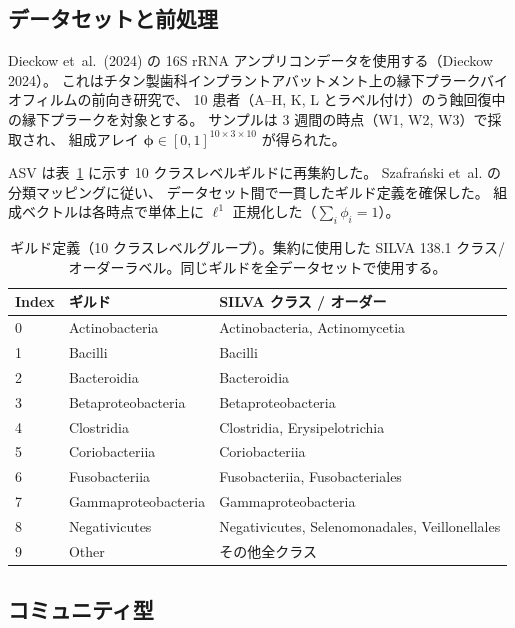 \documentclass[11pt,a4paper]{article}
\newcommand{\bphi}{\boldsymbol{\phi}}
\begin{document}
\subsection{データセットと前処理}
\label{ssec:data}

Dieckow et~al.~(2024) の 16S rRNA アンプリコンデータを使用する（Dieckow 2024）。
これはチタン製歯科インプラントアバットメント上の縁下プラークバイオフィルムの前向き研究で、
10 患者（A--H, K, L とラベル付け）のう蝕回復中の縁下プラークを対象とする。
サンプルは 3 週間の時点（W1, W2, W3）で採取され、
組成アレイ $\bphi \in [0,1]^{10 \times 3 \times 10}$ が得られた。

ASV は表~\ref{tab:guilds} に示す 10 クラスレベルギルドに再集約した。
Szafra\'{n}ski et~al. の分類マッピングに従い、
データセット間で一貫したギルド定義を確保した。
組成ベクトルは各時点で単体上に $\ell^1$ 正規化した（$\sum_i \phi_i = 1$）。

\begin{table}[htb]
\centering
\caption{ギルド定義（10 クラスレベルグループ）。集約に使用した SILVA 138.1 クラス/オーダーラベル。同じギルドを全データセットで使用する。}
\label{tab:guilds}
\small
\begin{tabular}{lll}
\toprule
\textbf{Index} & \textbf{ギルド} & \textbf{SILVA クラス / オーダー} \\
\midrule
0 & Actinobacteria       & Actinobacteria, Actinomycetia \\
1 & Bacilli              & Bacilli \\
2 & Bacteroidia          & Bacteroidia \\
3 & Betaproteobacteria   & Betaproteobacteria \\
4 & Clostridia           & Clostridia, Erysipelotrichia \\
5 & Coriobacteriia       & Coriobacteriia \\
6 & Fusobacteriia        & Fusobacteriia, Fusobacteriales \\
7 & Gammaproteobacteria  & Gammaproteobacteria \\
8 & Negativicutes        & Negativicutes, Selenomonadales, Veillonellales \\
9 & Other                & その他全クラス \\
\bottomrule
\end{tabular}
\end{table}

\subsection{コミュニティ型}
\label{ssec:ct}
\end{document}
